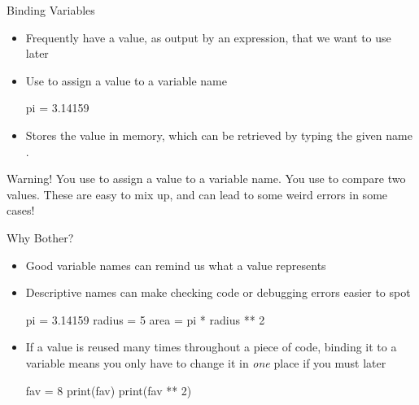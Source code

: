 \documentclass[pdf, aspectratio=169, 12pt]{beamer}
\begin{document}
\begin{frame}[fragile]{Binding Variables}
	\begin{itemize}
		\item Frequently have a \alert{value}, as output by an expression, that we want to use later
		\item Use \pyi{=} to \alert{assign} a value to a variable name
			\begin{pythoncode}[numbers=none]
				pi = 3.14159
			\end{pythoncode}
		\item Stores the value in memory, which can be retrieved by typing the given name .
	\end{itemize}
	\pause
	\begin{alertblock}{Warning!}
		You use \pyi{=} to assign a value to a variable name. You use \pyi{==} to compare two values. These are easy to mix up, and can lead to some weird errors in some cases!
	\end{alertblock}
\end{frame}

\begin{frame}[fragile]{Why Bother?}
	\vspace{5mm}
	\begin{itemize}
		\item Good variable names can remind us what a value represents
		\item Descriptive names can make checking code or debugging errors easier to spot
			\begin{pythoncode}
				pi = 3.14159
				radius = 5
				area = pi * radius ** 2
			\end{pythoncode}
		\item If a value is reused many times throughout a piece of code, binding it to a variable means you only have to change it in \emph{one} place if you must later
			\begin{pythoncode}
				fav = 8
				print(fav)
				print(fav ** 2)
			\end{pythoncode}
	\end{itemize}
\end{frame}
\end{document}
